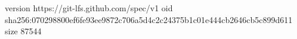 version https://git-lfs.github.com/spec/v1
oid sha256:070298800ef6fe93ee9872c706a5d4c2c24375b1c01e444cb2646cb5c899d611
size 87544

